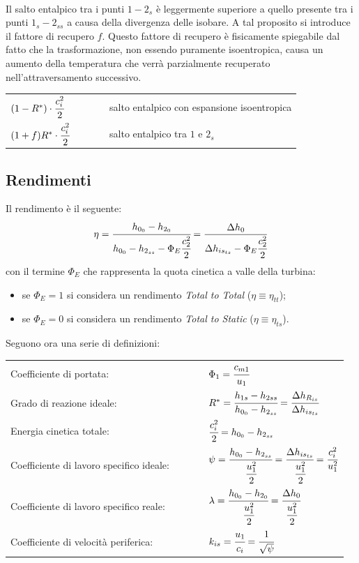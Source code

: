 \\Il salto entalpico tra i punti $1 - 2_s$ è leggermente superiore a quello presente tra i punti $1_s - 2_{ss}$ a causa della divergenza delle isobare. A tal proposito si introduce il fattore di recupero $f$. Questo fattore di recupero è fisicamente spiegabile dal fatto che la trasformazione, non essendo puramente isoentropica, causa un aumento della temperatura che verrà parzialmente recuperato nell'attraversamento successivo. 
\begin{center}
\begin{tabular}{l l l l l}
	$(1- R^*) \cdot \cfrac{c_i^2}{2}$ &&&& salto entalpico con espansione isoentropica\\
	$(1+f)R^* \cdot \cfrac{c_i^2}{2}$ &&&& salto entalpico tra $1$ e $2_s$\\
\end{tabular}
\end{center}
\subsection{Rendimenti}
Il rendimento è il seguente:
\begin{align*}
\eta = \cfrac{h_{0_0} - h_{2_0}}{h_{0_0} - h_{2_{ss}} - \Phi_E \cfrac{c_2^2}{2}} = \frac{\Delta h_0}{\Delta h_{is_{ts}}-\Phi_E \cfrac{c_2^2}{2}}
\end{align*}
con il termine $\Phi_E$ che rappresenta la quota cinetica a valle della turbina:
\begin{itemize}
	\item se $\Phi_E=1$ si considera un rendimento \textit{Total to Total} ($\eta \equiv \eta_{tt}$);
	\item se $\Phi_E=0$ si considera un rendimento \textit{Total to Static} ($\eta \equiv \eta_{ts}$).
\end{itemize}
Seguono ora una serie di definizioni:\\
\renewcommand\arraystretch{3}
\begin{tabular}{l l l l l}
	Coefficiente di portata: & & & &  $\Phi_1 = \cfrac{c_{m1}}{u_1}$\\
	Grado di reazione ideale: & & & & $R^* = \cfrac{h_{1s} - h_{2ss}}{h_{0_0} - h_{2_{ss}}} = \cfrac{\Delta h_{R_{is}}}{\Delta h_{is_{ts}}}$\\
	Energia cinetica totale: & & & &  $\cfrac{c_i^2}{2}=h_{0_0} - h_{2_{ss}}$\\
	Coefficiente di lavoro specifico ideale: & & & &  $\psi = \cfrac{h_{0_0} - h_{2_{ss}}}{\cfrac{u_1^2}{2}} = \cfrac{\Delta h_{is_{ts}}}{\cfrac{u_1^2}{2}}= \cfrac{c_i^2}{u_1^2}$\\
	Coefficiente di lavoro specifico reale: & & & &  $\lambda = \cfrac{h_{0_0} - h_{2_0}}{\cfrac{u_1^2}{2}}= \cfrac{\Delta h_0}{\cfrac{u_1^2}{2}}$\\
	Coefficiente di velocità periferica: & & & &  $k_{is} = \cfrac{u_1}{c_i} = \cfrac{1}{\sqrt{\psi}}$\\
\end{tabular}

